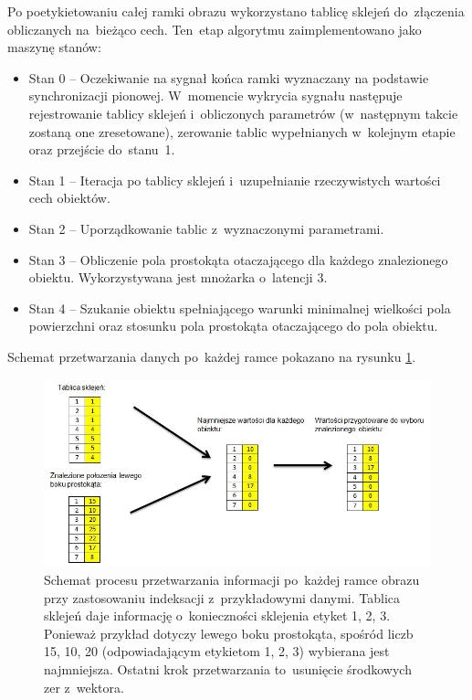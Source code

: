 Po poetykietowaniu całej ramki obrazu wykorzystano tablicę sklejeń do~złączenia obliczanych na~bieżąco cech. 
Ten~etap algorytmu zaimplementowano jako maszynę stanów:
\begin{itemize}
	\item Stan 0 -- Oczekiwanie na sygnał końca ramki wyznaczany na podstawie synchronizacji pionowej. W~momencie wykrycia sygnału następuje rejestrowanie tablicy sklejeń i~obliczonych parametrów (w~następnym takcie zostaną one zresetowane), zerowanie tablic wypełnianych w~kolejnym etapie oraz przejście do~stanu~1. %
	\item Stan 1 -- Iteracja po tablicy sklejeń i~uzupełnianie rzeczywistych wartości cech obiektów.
	\item Stan 2 -- Uporządkowanie tablic z~wyznaczonymi parametrami.
	\item Stan 3 -- Obliczenie pola prostokąta otaczającego dla każdego znalezionego obiektu. Wykorzystywana jest mnożarka o~latencji 3.
	\item Stan 4 -- Szukanie obiektu spełniającego warunki minimalnej wielkości pola powierzchni oraz stosunku pola prostokąta otaczającego do pola obiektu.
\end{itemize}
Schemat przetwarzania danych po~każdej ramce pokazano na rysunku \ref{fig:ind_schemat}.\\
\begin{figure}[h]
	\centering
	\includegraphics[width=\textwidth]{ind_schemat.jpg}
	\caption{Schemat procesu przetwarzania informacji po~każdej ramce obrazu przy zastosowaniu indeksacji z~przykładowymi danymi. Tablica sklejeń daje informację o~konieczności sklejenia etyket 1, 2, 3. Ponieważ przykład dotyczy lewego boku prostokąta, spośród liczb 15, 10, 20 (odpowiadającym etykietom 1, 2, 3) wybierana jest najmniejsza. Ostatni krok przetwarzania to~usunięcie środkowych zer z~wektora.}
	\label{fig:ind_schemat}
\end{figure}

